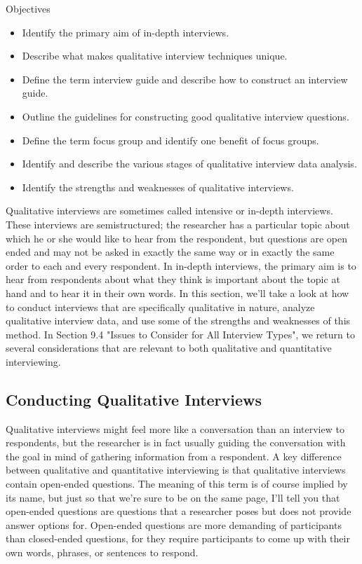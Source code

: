 \begin{center}
	\begin{objbox}{Objectives}
		\begin{itemize}
			\setlength{\itemsep}{0pt}
			\setlength{\parskip}{0pt}
			\setlength{\parsep}{0pt}
			
			\item Identify the primary aim of in-depth interviews.
			\item Describe what makes qualitative interview techniques unique.
			\item Define the term interview guide and describe how to construct an interview guide.
			\item Outline the guidelines for constructing good qualitative interview questions.
			\item Define the term focus group and identify one benefit of focus groups.
			\item Identify and describe the various stages of qualitative interview data analysis.
			\item Identify the strengths and weaknesses of qualitative interviews.
			
		\end{itemize}
	\end{objbox}
\end{center}

Qualitative interviews are sometimes called intensive or in-depth interviews. These interviews are semistructured; the researcher has a particular topic about which he or she would like to hear from the respondent, but questions are open ended and may not be asked in exactly the same way or in exactly the same order to each and every respondent. In in-depth interviews, the primary aim is to hear from respondents about what they think is important about the topic at hand and to hear it in their own words. In this section, we’ll take a look at how to conduct interviews that are specifically qualitative in nature, analyze qualitative interview data, and use some of the strengths and weaknesses of this method. In Section 9.4 "Issues to Consider for All Interview Types", we return to several considerations that are relevant to both qualitative and quantitative interviewing.

\subsection{Conducting Qualitative Interviews}

Qualitative interviews might feel more like a conversation than an interview to respondents, but the researcher is in fact usually guiding the conversation with the goal in mind of gathering information from a respondent. A key difference between qualitative and quantitative interviewing is that qualitative interviews contain open-ended questions. The meaning of this term is of course implied by its name, but just so that we’re sure to be on the same page, I’ll tell you that open-ended questions are questions that a researcher poses but does not provide answer options for. Open-ended questions are more demanding of participants than closed-ended questions, for they require participants to come up with their own words, phrases, or sentences to respond.

